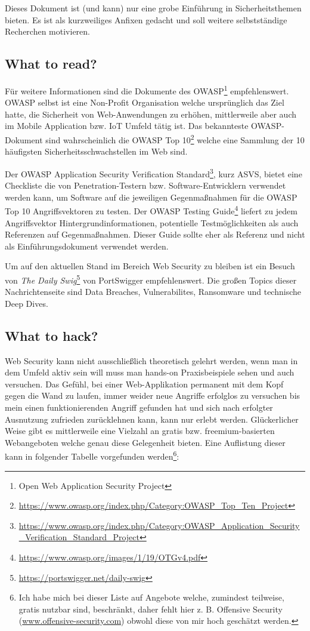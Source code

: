 Dieses Dokument ist (und kann) nur eine grobe Einführung in Sicherheitsthemen bieten. Es ist als kurzweiliges Anfixen gedacht und soll weitere selbstständige Recherchen motivieren.

\subsection{What to read?}

Für weitere Informationen sind die Dokumente des OWASP\footnote{Open Web Application Security Project} empfehlenswert. OWASP selbst ist eine Non-Profit Organisation welche ursprünglich das Ziel hatte, die Sicherheit von Web-Anwendungen zu erhöhen, mittlerweile aber auch im Mobile Application bzw. IoT Umfeld tätig ist. Das bekannteste OWASP-Dokument sind wahrscheinlich die OWASP Top 10\footnote{\url{https://www.owasp.org/index.php/Category:OWASP_Top_Ten_Project}} welche eine Sammlung der 10 häufigsten Sicherheitsschwachstellen im Web sind.

Der OWASP Application Security Verification Standard\footnote{\url{https://www.owasp.org/index.php/Category:OWASP_Application_Security_Verification_Standard_Project}}, kurz ASVS, bietet eine Checkliste die von Penetration-Testern bzw. Software-Entwicklern verwendet werden kann, um Software auf die jeweiligen Gegenmaßnahmen für die OWASP Top 10 Angriffsvektoren zu testen. Der OWASP Testing Guide\footnote{\url{https://www.owasp.org/images/1/19/OTGv4.pdf}} liefert zu jedem Angriffsvektor Hintergrundinformationen, potentielle Testmöglichkeiten als auch Referenzen auf Gegenmaßnahmen. Dieser Guide sollte eher als Referenz und nicht als Einführungsdokument verwendet werden.

Um auf den aktuellen Stand im Bereich Web Security zu bleiben ist ein Besuch von \textit{The Daily Swig}\footnote{\url{https://portswigger.net/daily-swig}} von PortSwigger empfehlenswert. Die großen Topics dieser Nachrichtenseite sind Data Breaches, Vulnerabilites, Ransomware und technische Deep Dives.

\subsection{What to hack?}

Web Security kann nicht ausschließlich theoretisch gelehrt werden, wenn man in dem Umfeld aktiv sein will muss man hands-on Praxisbeispiele sehen und auch versuchen. Das Gefühl, bei einer Web-Applikation permanent mit dem Kopf gegen die Wand zu laufen, immer weider neue Angriffe erfolglos zu versuchen bis mein einen funktionierenden Angriff gefunden hat und sich nach erfolgter Ausnutzung zufrieden zurücklehnen kann, kann nur erlebt werden. Glückerlicher Weise gibt es mittlerweile eine Vielzahl an gratis bzw. freemium-basierten Webangeboten welche genau diese Gelegenheit bieten. Eine Auflistung dieser kann in folgender Tabelle vorgefunden werden\footnote{Ich habe mich bei dieser Liste auf Angebote welche, zumindest teilweise, gratis nutzbar sind, beschränkt, daher fehlt hier z. B. Offensive Security (\url{www.offensive-security.com}) obwohl diese von mir hoch geschätzt werden.}:


